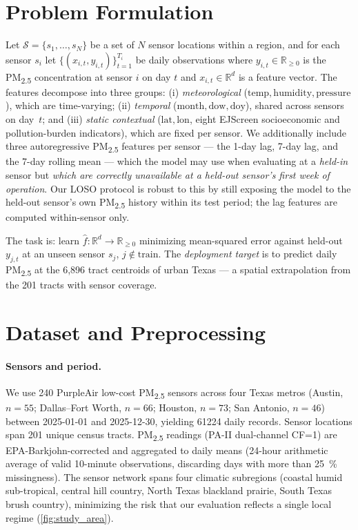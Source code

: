 \documentclass{article}
\begin{document}
\section{Problem Formulation}

Let $\mathcal{S} = \{s_1, \dots, s_N\}$ be a set of $N$ sensor locations within a region, and for each sensor $s_i$ let $\{(x_{i,t}, y_{i,t})\}_{t=1}^{T_i}$ be daily observations where $y_{i,t} \in \mathbb{R}_{\geq 0}$ is the PM\textsubscript{2.5} concentration at sensor $i$ on day $t$ and $x_{i,t} \in \mathbb{R}^d$ is a feature vector. The features decompose into three groups: (i) \emph{meteorological} ($\mathrm{temp}, \mathrm{humidity}, \mathrm{pressure}$), which are time-varying; (ii) \emph{temporal} ($\mathrm{month}, \mathrm{dow}, \mathrm{doy}$), shared across sensors on day~$t$; and (iii) \emph{static contextual} ($\mathrm{lat}, \mathrm{lon}$, eight EJScreen socioeconomic and pollution-burden indicators), which are fixed per sensor. We additionally include three autoregressive PM\textsubscript{2.5} features per sensor --- the 1-day lag, 7-day lag, and the 7-day rolling mean --- which the model may use when evaluating at a \emph{held-in} sensor but \emph{which are correctly unavailable at a held-out sensor's first week of operation}. Our LOSO protocol is robust to this by still exposing the model to the held-out sensor's own PM\textsubscript{2.5} history within its test period; the lag features are computed within-sensor only.

The task is: learn $\hat{f} : \mathbb{R}^d \rightarrow \mathbb{R}_{\geq 0}$ minimizing mean-squared error against held-out $y_{j,t}$ at an unseen sensor $s_j$, $j \notin \mathrm{train}$. The \emph{deployment target} is to predict daily PM\textsubscript{2.5} at the 6{,}896 tract centroids of urban Texas --- a spatial extrapolation from the 201 tracts with sensor coverage.

\section{Dataset and Preprocessing}
\label{sec:data}

\paragraph{Sensors and period.} We use 240 PurpleAir low-cost PM\textsubscript{2.5} sensors across four Texas metros (Austin, $n{=}55$; Dallas--Fort Worth, $n{=}66$; Houston, $n{=}73$; San Antonio, $n{=}46$) between \num{2025}-01-01 and \num{2025}-12-30, yielding \num{61224} daily records. Sensor locations span 201 unique census tracts. PM\textsubscript{2.5} readings (PA-II dual-channel CF=1) are EPA-Barkjohn-corrected \citep{barkjohn2021} and aggregated to daily means (24-hour arithmetic average of valid 10-minute observations, discarding days with more than \SI{25}{\percent} missingness). The sensor network spans four climatic subregions (coastal humid sub-tropical, central hill country, North Texas blackland prairie, South Texas brush country), minimizing the risk that our evaluation reflects a single local regime (\autoref{fig:study_area}).
\end{document}
